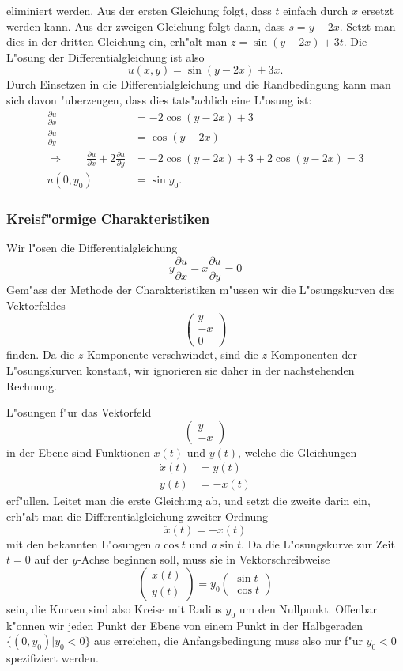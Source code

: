 eliminiert werden.
Aus der ersten Gleichung folgt, dass $t$ einfach durch $x$ ersetzt werden
kann.
Aus der zweigen Gleichung folgt dann, dass $s=y-2x$.
Setzt man dies in der dritten Gleichung ein, erh"alt man $z=\sin(y-2x)+3t$.
Die L"osung der Differentialgleichung ist also
\[
u(x,y)=\sin(y-2x)+3x.
\]
Durch Einsetzen in die Differentialgleichung und die Randbedingung
kann man sich davon "uberzeugen, dass dies tats"achlich eine L"osung
ist:
\begin{align*}
\frac{\partial u}{\partial x}
&=-2\cos(y-2x)+3
\\
\frac{\partial u}{\partial y}
&=\cos (y-2x)
\\
\Rightarrow\qquad
\frac{\partial u}{\partial x}
+2
\frac{\partial u}{\partial y}
&=
-2\cos(y-2x)+3
+2\cos(y-2x)=3
\\
u(0,y_0)&=\sin y_0.
\end{align*}

\subsubsection{Kreisf"ormige Charakteristiken}
Wir l"osen die Differentialgleichung
\[
y\frac{\partial u}{\partial x}-x\frac{\partial u}{\partial y}=0
\]
Gem"ass der Methode der Charakteristiken m"ussen wir die L"osungskurven
des Vektorfeldes
\[
\begin{pmatrix}
y\\-x\\0
\end{pmatrix}
\]
finden. Da die $z$-Komponente verschwindet, sind die $z$-Komponenten
der L"osungskurven konstant, wir ignorieren sie daher in der nachstehenden
Rechnung.

L"osungen f"ur das Vektorfeld 
\[
\begin{pmatrix}
y\\-x
\end{pmatrix}
\]
in der Ebene sind Funktionen $x(t)$ und $y(t)$, welche die Gleichungen
\begin{align*}
\dot x(t)&=y(t)\\
\dot y(t)&=-x(t)
\end{align*}
erf"ullen. Leitet man die erste Gleichung ab, und setzt die zweite
darin ein, erh"alt man die Differentialgleichung zweiter Ordnung
\[
\ddot x(t)=-x(t)
\]
mit den bekannten L"osungen $a\cos t$ und $a \sin t$. Da die L"osungskurve
zur Zeit $t=0$ auf der $y$-Achse beginnen soll, muss sie in Vektorschreibweise
\[
\begin{pmatrix}
x(t)\\y(t)
\end{pmatrix}
=y_0\begin{pmatrix}
\sin t\\
\cos t
\end{pmatrix}
\]
sein, die Kurven sind also Kreise mit Radius $y_0$ um den Nullpunkt. Offenbar
k"onnen wir jeden Punkt der Ebene von einem Punkt in der Halbgeraden
$\{(0,y_0)|y_0 <0\}$ aus erreichen, die Anfangsbedingung muss also nur f"ur
$y_0<0$ spezifiziert werden.

